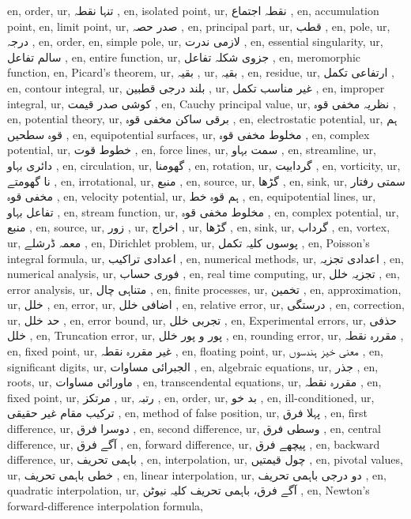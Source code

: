 en, order,
ur, تنہا نقطہ ,
en, isolated point,
ur, نقطہ اجتماع ,
en, accumulation point,
en, limit point,
ur, صدر حصہ ,
en, principal part,
ur, قطب ,
en, pole,
ur, درجہ ,
en, order,
en, simple pole,
ur, لازمی ندرت ,
en, essential singularity,
ur, سالم تفاعل ,
en, entire function,
ur, جزوی شکلہ تفاعل ,
en, meromorphic function,
en, Picard's theorem,
ur, بقیہ ,
ur, بقیہ ,
en, residue,
ur, ارتفاعی تکمل ,
en, contour integral,
ur, بلند درجی قطبین ,
ur, غیر مناسب تکمل ,
en, improper integral,
ur, کوشی صدر قیمت ,
en, Cauchy principal value,
ur, نظریہ مخفی قوہ ,
en, potential theory,
ur, برقی ساکن مخفی قوہ ,
en, electrostatic potential,
ur, ہم قوہ سطحیں ,
en, equipotential surfaces,
ur, مخلوط مخفی قوہ ,
en, complex potential,
ur, خطوط قوت ,
en, force lines,
ur, سمت بہاو ,
en, streamline,
ur, دائری بہاو ,
en, circulation,
ur, گھومنا ,
en, rotation,
ur, گردابیت ,
en, vorticity,
ur, نا گھومتے ,
en, irrotational,
ur, منبع ,
en, source,
ur, گڑھا ,
en, sink,
ur, سمتی رفتار مخفی قوہ ,
en, velocity potential,
ur, ہم قوہ خط ,
en, equipotential lines,
ur, تفاعل بہاو ,
en, stream function,
ur, مخلوط مخفی قوہ ,
en, complex potential,
ur, منبع ,
en, source,
ur, زور ,
ur, اخراج ,
ur, گڑھا ,
en, sink,
ur, گرداب ,
en, vortex,
ur, معمہ ڈرشلے ,
en, Dirichlet problem,
ur, پوسوں کلیہ تکمل ,
en, Poisson's integral formula,
ur, اعدادی تراکیب ,
en, numerical methods,
ur, اعدادی تجزیہ ,
en, numerical analysis,
ur, فوری حساب ,
en, real time computing,
ur, تجزیہ خلل ,
en, error analysis,
ur, متناہی چال ,
en, finite processes,
ur, تخمین ,
en, approximation,
ur, خلل ,
en, error,
ur, اضافی خلل ,
en, relative error,
ur, درستگی ,
en, correction,
ur, حد خلل ,
en, error bound,
ur, تجربی خلل ,
en, Experimental errors,
ur, حذفی خلل ,
en, Truncation error,
ur, پور و پور خلل ,
en, rounding error,
ur, مقررہ نقطہ ,
en, fixed point,
ur, غیر مقررہ نقطہ ,
en, floating point,
ur, معنی خیز ہندسوں ,
en, significant digits,
ur, الجبرائی مساوات ,
en, algebraic equations,
ur, جذر ,
en, roots,
ur, ماورائی مساوات ,
en, transcendental equations,
ur, مقررہ نقطہ ,
en, fixed point,
ur, مرتکز ,
ur, رتبہ ,
en, order,
ur, بد خو ,
en, ill-conditioned,
ur, ترکیب مقام غیر حقیقی ,
en, method of false position,
ur, پہلا فرق ,
en, first difference,
ur, دوسرا فرق ,
en, second difference,
ur, وسطی فرق ,
en, central difference,
ur, آگے فرق ,
en, forward difference,
ur, پیچھے فرق ,
en, backward difference,
ur, باہمی تحریف ,
en, interpolation,
ur, چول قیمتیں ,
en, pivotal values,
ur, خطی باہمی تحریف ,
en, linear interpolation,
ur, دو درجی باہمی تحریف ,
en, quadratic interpolation,
ur, آگے فرق، باہمی تحریف کلیہ نیوٹن ,
en, Newton's forward-difference interpolation formula,
